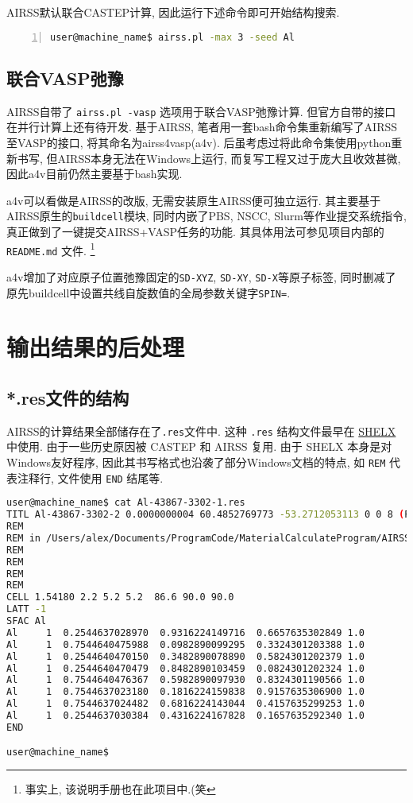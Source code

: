 \documentclass[a4paper, 10pt]{article}
\begin{document}
AIRSS默认联合CASTEP计算, 因此运行下述命令即可开始结构搜索.
\begin{lstlisting}[language={bash},numbers=left]
user@machine_name$ airss.pl -max 3 -seed Al
\end{lstlisting}

\subsection{联合VASP弛豫}
AIRSS自带了 \verb|airss.pl -vasp| 选项用于联合VASP弛豫计算. 但官方自带的接口在并行计算上还有待开发. 基于AIRSS, 笔者用一套bash命令集重新编写了AIRSS至VASP的接口, 将其命名为airss4vasp(a4v). 后虽考虑过将此命令集使用python重新书写, 但AIRSS本身无法在Windows上运行, 而复写工程又过于庞大且收效甚微, 因此a4v目前仍然主要基于bash实现.

a4v可以看做是AIRSS的改版, 无需安装原生AIRSS便可独立运行. 其主要基于AIRSS原生的\verb|buildcell|模块, 同时内嵌了PBS, NSCC, Slurm等作业提交系统指令, 真正做到了一键提交AIRSS+VASP任务的功能. 其具体用法可参见项目内部的 \verb|README.md| 文件. \footnote{事实上, 该说明手册也在此项目中.(笑} 

a4v增加了对应原子位置弛豫固定的\verb|SD-XYZ|, \verb|SD-XY|, \verb|SD-X|等原子标签, 同时删减了原先buildcell中设置共线自旋数值的全局参数关键字\verb|SPIN=|.

\newpage
\section{输出结果的后处理}
\subsection{*.res文件的结构}
AIRSS的计算结果全部储存在了\verb|.res|文件中. 这种 \verb|.res| 结构文件最早在 \href{https://strucbio.biologie.uni-konstanz.de/ccp4wiki/index.php/SHELXL}{SHELX} 中使用. 由于一些历史原因被 CASTEP 和 AIRSS 复用. 由于 SHELX 本身是对Windows友好程序, 因此其书写格式也沿袭了部分Windows文档的特点, 如 \verb|REM| 代表注释行, 文件使用 \verb|END| 结尾等.

\begin{lstlisting}[language={bash}]
user@machine_name$ cat Al-43867-3302-1.res
TITL Al-43867-3302-2 0.0000000004 60.4852769773 -53.2712053113 0 0 8 (P63/mmc) n - 1
REM
REM in /Users/alex/Documents/ProgramCode/MaterialCalculateProgram/AIRSS/airss-0.9/examples/1.1
REM
REM
REM
REM
CELL 1.54180 2.2 5.2 5.2  86.6 90.0 90.0
LATT -1
SFAC Al 
Al     1  0.2544637028970  0.9316224149716  0.6657635302849 1.0
Al     1  0.7544640475988  0.0982890099295  0.3324301203388 1.0
Al     1  0.2544640470150  0.3482890078890  0.5824301202379 1.0
Al     1  0.2544640470479  0.8482890103459  0.0824301202324 1.0
Al     1  0.7544640476367  0.5982890097930  0.8324301190566 1.0
Al     1  0.7544637023180  0.1816224159838  0.9157635306900 1.0
Al     1  0.7544637024482  0.6816224143044  0.4157635299253 1.0
Al     1  0.2544637030384  0.4316224167828  0.1657635292340 1.0
END

user@machine_name$
\end{lstlisting}
\end{document}
